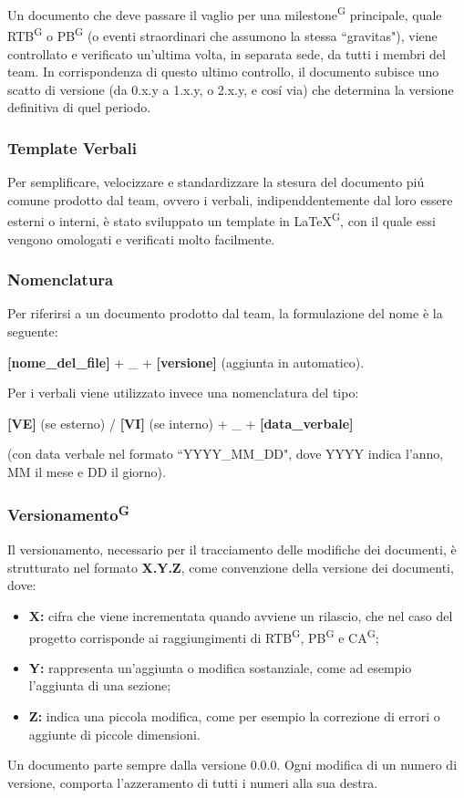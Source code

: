 \documentclass[8pt]{article}
\newcommand{\glossterm}[1]{#1\textsuperscript{G}} %
\begin{document}
Un documento che deve passare il vaglio per una \glossterm{milestone} principale, quale \glossterm{RTB} o \glossterm{PB} (o eventi straordinari che assumono la stessa ``gravitas"), viene controllato e verificato un'ultima volta, in separata sede, da tutti i membri del team.
In corrispondenza di questo ultimo controllo, il documento subisce uno scatto di versione (da 0.x.y a 1.x.y, o 2.x.y, e cosí via) che determina la versione definitiva di quel periodo.

\subsubsection{Template Verbali}
Per semplificare, velocizzare e standardizzare la stesura del documento piú comune prodotto dal
team, ovvero i verbali, indipenddentemente dal loro essere esterni o interni, è  stato sviluppato un template in \glossterm{\LaTeX}, con il quale essi vengono omologati e verificati molto facilmente.
\subsubsection{Nomenclatura}
Per riferirsi a un documento prodotto dal team, la formulazione del nome è la seguente:
\begin{center}
\textbf{[nome\_del\_file]} + \_ + \textbf{[versione]} (aggiunta in automatico). 
\end{center}
Per i verbali viene utilizzato invece una nomenclatura del tipo:
\begin{center}
\textbf{[VE]} (se esterno) / \textbf{[VI]} (se interno) + \_ + \textbf{[data\_verbale]}
\end{center}
(con data verbale nel formato ``YYYY\_MM\_DD", dove YYYY indica l'anno, MM il mese e DD il giorno). 

\subsubsection{\glossterm{Versionamento}}
Il versionamento, necessario per il tracciamento delle modifiche dei documenti, è strutturato nel
formato \textbf{X.Y.Z}, come convenzione della versione dei documenti, dove:
\begin{itemize}
    \item \textbf{X:} cifra che viene incrementata quando avviene un rilascio, che nel caso del progetto corrisponde ai raggiungimenti di \glossterm{RTB}, \glossterm{PB} e \glossterm{CA};
    \item \textbf{Y:} rappresenta un'aggiunta o modifica sostanziale, come ad esempio l'aggiunta di una sezione;
    \item \textbf{Z:} indica una piccola modifica, come per esempio la correzione di errori o aggiunte di piccole dimensioni.
\end{itemize}
Un documento parte sempre dalla versione 0.0.0. Ogni modifica di un numero di versione, comporta l'azzeramento di tutti i numeri alla sua destra.
\end{document}

